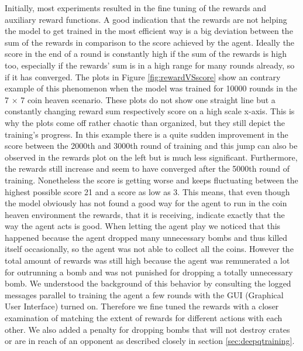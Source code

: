 Initially, most experiments resulted in the fine tuning of the rewards and auxiliary reward functions. A good indication that the rewards are not helping the model to get trained in the most efficient way is a big deviation between the sum of the rewards in comparison to the score achieved by the agent. Ideally the score in the end of a round is constantly high if the sum of the rewards is high too, especially if the rewards' sum is in a high range for many rounds already, so if it has converged. The plots in Figure \ref{fig:rewardVSscore} show an contrary example of this phenomenon when the model was trained for 10000 rounds in the 7 $\times$ 7 coin heaven scenario. These plots do not show one straight line but a constantly changing reward sum respectively score on a high scale x-axis. This is why the plots come off rather chaotic than organized, but they still depict the training's progress. In this example there is a quite sudden improvement in the score between the 2000th and 3000th round of training and this jump can also be observed in the rewards plot on the left but is much less significant. Furthermore, the rewards still increase and seem to have converged after the 5000th round of training. Nonetheless the score is getting worse and keeps fluctuating between the highest possible score 21 and a score as low as 3. This means, that even though the model obviously has not found a good way for the agent to run in the coin heaven environment the rewards, that it is receiving, indicate exactly that the way the agent acts is good. When letting the agent play we noticed that this happened because the agent dropped many unnecessary bombs and thus killed itself occasionally, so the agent was not able to collect all the coins. However the total amount of rewards was still high because the agent was remunerated a lot for outrunning a bomb and was not punished for dropping a totally unnecessary bomb. We understood the background of this behavior by consulting the logged messages parallel to training the agent a few rounds with the GUI (Graphical User Interface) turned on. Therefore we fine tuned the rewards with a closer examination of matching the extent of rewards for different actions with each other. We also added a penalty for dropping bombs that will not destroy crates or are in reach of an opponent as described closely in section \ref{sec:deepqtraining}. 
